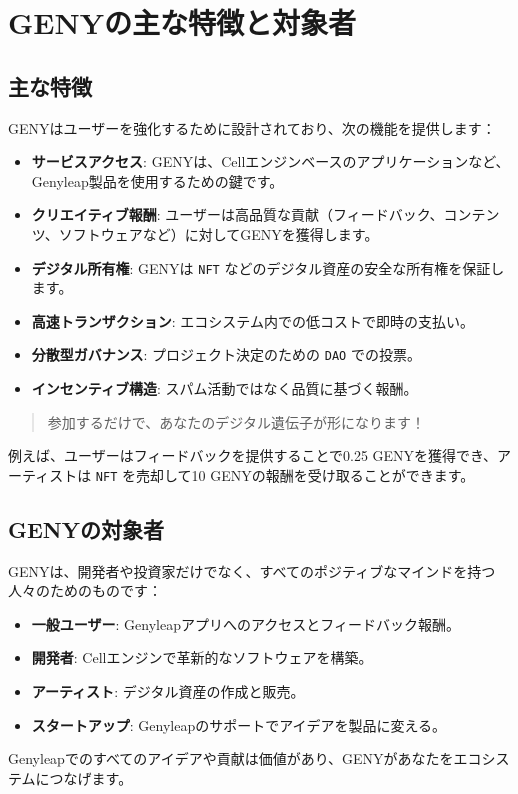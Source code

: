 \documentclass[a4paper,12pt,openany]{book}
\begin{document}
\section*{GENYの主な特徴と対象者}
\subsection*{主な特徴}
GENYはユーザーを強化するために設計されており、次の機能を提供します：
\begin{itemize}
    \item \textbf{サービスアクセス}: GENYは、Cellエンジンベースのアプリケーションなど、Genyleap製品を使用するための鍵です。
    \item \textbf{クリエイティブ報酬}: ユーザーは高品質な貢献（フィードバック、コンテンツ、ソフトウェアなど）に対してGENYを獲得します。
    \item \textbf{デジタル所有権}: GENYは \texttt{NFT} などのデジタル資産の安全な所有権を保証します。
    \item \textbf{高速トランザクション}: エコシステム内での低コストで即時の支払い。
    \item \textbf{分散型ガバナンス}: プロジェクト決定のための \texttt{DAO} での投票。
    \item \textbf{インセンティブ構造}: スパム活動ではなく品質に基づく報酬。
\end{itemize}
\begin{quote}
参加するだけで、あなたのデジタル遺伝子が形になります！
\end{quote}
例えば、ユーザーはフィードバックを提供することで0.25 GENYを獲得でき、アーティストは \texttt{NFT} を売却して10 GENYの報酬を受け取ることができます。

\subsection*{GENYの対象者}
GENYは、開発者や投資家だけでなく、すべてのポジティブなマインドを持つ人々のためのものです：
\begin{itemize}
    \item \textbf{一般ユーザー}: Genyleapアプリへのアクセスとフィードバック報酬。
    \item \textbf{開発者}: Cellエンジンで革新的なソフトウェアを構築。
    \item \textbf{アーティスト}: デジタル資産の作成と販売。
    \item \textbf{スタートアップ}: Genyleapのサポートでアイデアを製品に変える。
\end{itemize}
Genyleapでのすべてのアイデアや貢献は価値があり、GENYがあなたをエコシステムにつなげます。
\newpage
\end{document}
